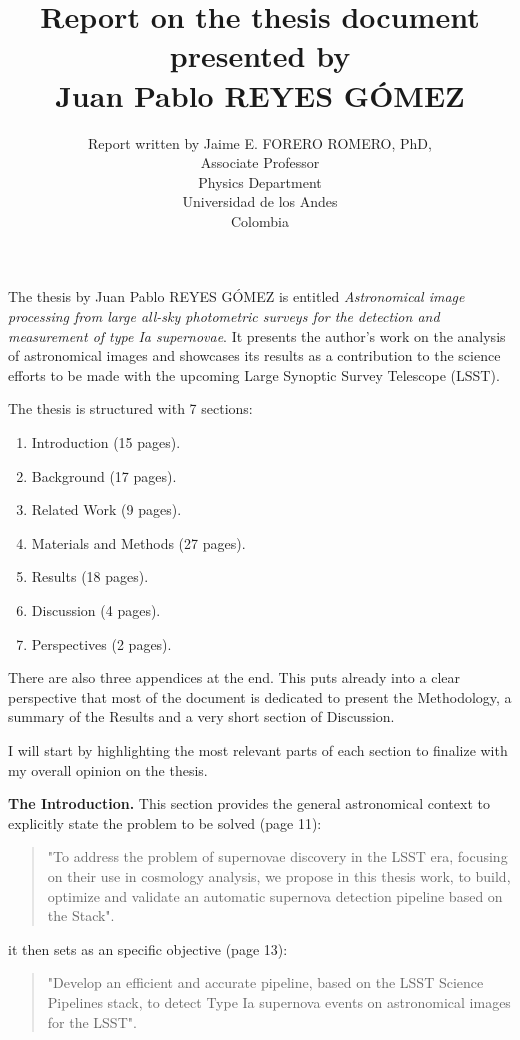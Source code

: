 \documentclass{article}
\begin{document}
\title{Report on the thesis document presented by \\
Juan Pablo REYES G\'OMEZ}
\author{Report written by Jaime E. FORERO ROMERO, PhD,\\
Associate Professor\\ Physics Department\\ Universidad de los Andes\\ Colombia}
\maketitle

The thesis by Juan Pablo REYES G\'OMEZ is entitled \emph{Astronomical image processing from large all-sky photometric surveys for the detection and measurement of type Ia supernovae}. 
It presents the author's work on the analysis of astronomical images and showcases its results as a contribution to the science efforts to be made with the upcoming Large Synoptic Survey Telescope (LSST).

The thesis is structured with 7 sections:
\begin{enumerate}
    \item Introduction (15 pages).
    \item Background (17 pages).
    \item Related Work (9 pages).
    \item Materials and Methods (27 pages).
    \item Results (18 pages).
    \item Discussion (4 pages).
    \item Perspectives (2 pages).
\end{enumerate}

There are also three appendices at the end. This puts already into a
clear perspective that most of the document is dedicated to present
the Methodology, a summary of the Results and a very short section of Discussion.

I will start by highlighting the most relevant parts of each section to finalize with my overall opinion on the thesis. 

\newpage
{\bf The Introduction.} This section provides the general astronomical
context to explicitly state the problem to be solved (page 11): 
\begin{quote}
   "To address the problem of supernovae discovery in the LSST era,
   focusing on their use in cosmology analysis, we propose in this
   thesis work, to build, optimize and validate an automatic supernova
   detection pipeline based on the Stack". 
\end{quote}
it then sets as an specific objective (page 13):
\begin{quote}
    "Develop an efficient and accurate pipeline, based on the LSST
    Science Pipelines stack, to detect Type Ia supernova events on
    astronomical images for the LSST".
\end{quote}
\end{document}
